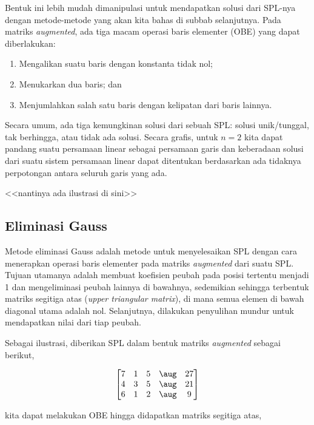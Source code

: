 Bentuk ini lebih mudah dimanipulasi untuk mendapatkan solusi dari SPL-nya dengan metode-metode yang akan kita bahas di subbab selanjutnya. Pada matriks \textit{augmented}, ada tiga macam operasi baris elementer (OBE) yang dapat diberlakukan:

\begin{enumerate}
    \item Mengalikan suatu baris dengan konstanta tidak nol;
    \item Menukarkan dua baris; dan
    \item Menjumlahkan salah satu baris dengan kelipatan dari baris lainnya.
\end{enumerate}

Secara umum, ada tiga kemungkinan solusi dari sebuah SPL: solusi unik/tunggal, tak berhingga, atau tidak ada solusi. Secara grafis, untuk $n = 2$ kita dapat pandang suatu persamaan linear sebagai persamaan garis dan keberadaan solusi dari suatu sistem persamaan linear dapat ditentukan berdasarkan ada tidaknya perpotongan antara seluruh garis yang ada. 

{\centering <<nantinya ada ilustrasi di sini>> \par}

\subsection{Eliminasi Gauss}

Metode eliminasi Gauss adalah metode untuk menyelesaikan SPL dengan cara menerapkan operasi baris elementer pada matriks \textit{augmented} dari suatu SPL. Tujuan utamanya adalah membuat koefisien peubah pada posisi tertentu menjadi 1 dan mengeliminasi peubah lainnya di bawahnya, sedemikian sehingga terbentuk matriks segitiga atas (\textit{upper triangular matrix}), di mana semua elemen di bawah diagonal utama adalah nol. Selanjutnya, dilakukan penyulihan mundur untuk mendapatkan nilai dari tiap peubah. 

Sebagai ilustrasi, diberikan SPL dalam bentuk matriks \textit{augmented} sebagai berikut,

\[
    \begin{bmatrix}
        7 & 1 & 5 & \aug & 27 \\
        4 & 3 & 5 & \aug & 21 \\
        6 & 1 & 2 & \aug & 9 
    \end{bmatrix}
\]

kita dapat melakukan OBE hingga didapatkan matriks segitiga atas,

